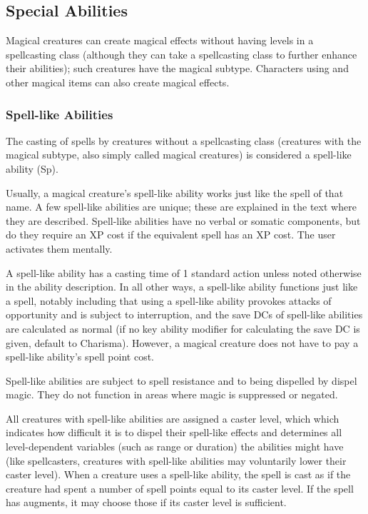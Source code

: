\subsection{Special Abilities}
Magical creatures can create magical effects without having levels in a spellcasting class (although they can take a spellcasting class to further enhance their abilities); such creatures have the magical subtype.
Characters using  and other magical items can also create magical effects.

\subsubsection{Spell-like Abilities}
The casting of spells by creatures without a spellcasting class (creatures with the magical subtype, also simply called magical creatures) is considered a spell-like ability (Sp). 

Usually, a magical creature's spell-like ability works just like the spell of that name. 
A few spell-like abilities are unique; these are explained in the text where they are described.
Spell-like abilities have no verbal or somatic components, but do they require an XP cost if the equivalent spell has an XP cost. 
The user activates them mentally.

A spell-like ability has a casting time of 1 standard action unless noted otherwise in the ability description. 
In all other ways, a spell-like ability functions just like a spell, notably including that using a spell-like ability provokes attacks of opportunity and is subject to interruption, and the save DCs of spell-like abilities are calculated as normal (if no key ability modifier for calculating the save DC is given, default to Charisma). 
However, a magical creature does not have to pay a spell-like ability's spell point cost.

Spell-like abilities are subject to spell resistance and to being dispelled by dispel magic. 
They do not function in areas where magic is suppressed or negated.

All creatures with spell-like abilities are assigned a caster level, which which indicates how difficult it is to dispel their spell-like effects and determines all level-dependent variables (such as range or duration) the abilities might have (like spellcasters, creatures with spell-like abilities may voluntarily lower their caster level). 
When a creature uses a spell-like ability, the spell is cast as if the creature had spent a number of spell points equal to its caster level.
If the spell has augments, it may choose those if its caster level is sufficient.
